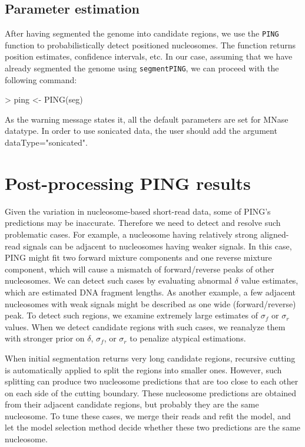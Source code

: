 \documentclass[11pt]{article}
\begin{document}
\subsection{Parameter estimation}
After having segmented the genome into candidate regions, we use the \texttt{PING} function to probabilistically detect positioned nucleosomes.
The function returns position estimates, confidence intervals, etc. In our case, assuming that we have already segmented the genome using \texttt{segmentPING}, we can proceed with the following command: 

\begin{Schunk}
\begin{Sinput}
> ping <- PING(seg)
\end{Sinput}
\end{Schunk}

As the warning message states it, all the default parameters are set for MNase datatype. In order to use sonicated data, the user should add the argument dataType="sonicated".


\section{Post-processing PING results}
Given the variation in nucleosome-based short-read data, some of PING's predictions may be inaccurate. Therefore we need to detect and resolve such problematic cases. 
For example, a nucleosome having relatively strong aligned-read signals can be adjacent to nucleosomes having weaker signals. In this case, PING might fit two forward mixture components and one reverse mixture component, which will cause a mismatch of forward/reverse peaks of other nucleosomes. We can detect such cases by evaluating abnormal $\delta$ value estimates, which are estimated DNA fragment lengths. 
As another example, a few adjacent nucleosomes with weak signals might be described as one wide (forward/reverse) peak. To detect such regions, we examine extremely large estimates of $\sigma_f$ or $\sigma_r$ values. When we detect candidate regions with such cases, we reanalyze them with stronger prior on $\delta$,  $\sigma_f$, or $\sigma_r$ to penalize atypical estimations.

When initial segmentation returns very long candidate regions, recursive cutting is automatically applied to split the regions into smaller ones. However, such splitting can produce two nucleosome predictions that are too close to each other on each side of the cutting boundary. These nucleosome predictions are obtained from their adjacent candidate regions, but probably they are the same nucleosome. To tune these cases, we merge their reads and refit the model, and let the model selection method decide whether these two predictions are the same nucleosome.
\end{document}
